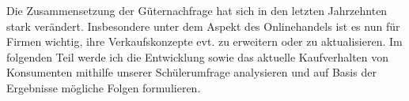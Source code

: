 Die Zusammensetzung der Güternachfrage hat sich in den letzten Jahrzehnten stark verändert. Insbesondere unter dem Aspekt des Onlinehandels ist es nun für Firmen wichtig, ihre Verkaufskonzepte evt. zu erweitern oder zu aktualisieren. Im folgenden Teil werde ich die Entwicklung sowie das aktuelle Kaufverhalten von Konsumenten mithilfe unserer Schülerumfrage analysieren und auf Basis der Ergebnisse mögliche Folgen formulieren.
